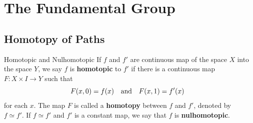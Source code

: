 \documentclass[12pt,a4paper]{article}
\begin{document}
    \newpage

    \section{The Fundamental Group}
    \subsection{Homotopy of Paths}
    \begin{defi}{Homotopic and Nulhomotopic}
        If $f$ and $f'$ are continuous map of the space $X$ into the space $Y$, we say $f$ is \textbf{homotopic} to $f'$ if there is a continuous map $F:X\times I\to Y$ such that 
        \[
            F(x,0)=f(x)\quad\text{and}\quad F(x,1)=f'(x)
        \]
        for each $x$. The map $F$ is called a \textbf{homotopy} between $f$ and $f'$, denoted by $f\simeq f'$. If $f\simeq f'$ and $f'$ is a constant map, we say that $f$ is \textbf{nulhomotopic}.
    \end{defi}
    
\end{document}
